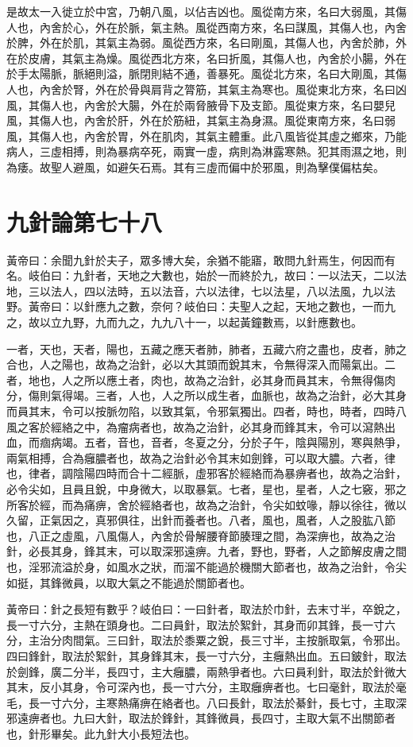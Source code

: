 是故太一入徙立於中宮，乃朝八風，以佔吉凶也。風從南方來，名曰大弱風，其傷人也，內舍於心，外在於脈，氣主熱。風從西南方來，名曰謀風，其傷人也，內舍於脾，外在於肌，其氣主為弱。風從西方來，名曰剛風，其傷人也，內舍於肺，外在於皮膚，其氣主為燥。風從西北方來，名曰折風，其傷人也，內舍於小腸，外在於手太陽脈，脈絕則溢，脈閉則結不通，善暴死。風從北方來，名曰大剛風，其傷人也，內舍於腎，外在於骨與肩背之膂筋，其氣主為寒也。風從東北方來，名曰凶風，其傷人也，內舍於大腸，外在於兩脅腋骨下及支節。風從東方來，名曰嬰兒風，其傷人也，內舍於肝，外在於筋紐，其氣主為身濕。風從東南方來，名曰弱風，其傷人也，內舍於胃，外在肌肉，其氣主體重。此八風皆從其虛之鄉來，乃能病人，三虛相搏，則為暴病卒死，兩實一虛，病則為淋露寒熱。犯其雨濕之地，則為痿。故聖人避風，如避矢石焉。其有三虛而偏中於邪風，則為擊僕偏枯矣。


\section{九針論第七十八}

黃帝曰：余聞九針於夫子，眾多博大矣，余猶不能寤，敢問九針焉生，何因而有名。岐伯曰：九針者，天地之大數也，始於一而終於九，故曰：一以法天，二以法地，三以法人，四以法時，五以法音，六以法律，七以法星，八以法風，九以法野。黃帝曰：以針應九之數，奈何？岐伯曰：夫聖人之起，天地之數也，一而九之，故以立九野，九而九之，九九八十一，以起黃鐘數焉，以針應數也。

一者，天也，天者，陽也，五藏之應天者肺，肺者，五藏六府之盡也，皮者，肺之合也，人之陽也，故為之治針，必以大其頭而銳其末，令無得深入而陽氣出。二者，地也，人之所以應土者，肉也，故為之治針，必其身而員其末，令無得傷肉分，傷則氣得竭。三者，人也，人之所以成生者，血脈也，故為之治針，必大其身而員其末，令可以按脈勿陷，以致其氣，令邪氣獨出。四者，時也，時者，四時八風之客於經絡之中，為瘤病者也，故為之治針，必其身而鋒其末，令可以瀉熱出血，而痼病竭。五者，音也，音者，冬夏之分，分於子午，陰與陽別，寒與熱爭，兩氣相搏，合為癰膿者也，故為之治針必令其末如劍鋒，可以取大膿。六者，律也，律者，調陰陽四時而合十二經脈，虛邪客於經絡而為暴痹者也，故為之治針，必令尖如，且員且銳，中身微大，以取暴氣。七者，星也，星者，人之七竅，邪之所客於經，而為痛痹，舍於經絡者也，故為之治針，令尖如蚊喙，靜以徐往，微以久留，正氣因之，真邪俱往，出針而養者也。八者，風也，風者，人之股肱八節也，八正之虛風，八風傷人，內舍於骨解腰脊節腠理之間，為深痹也，故為之治針，必長其身，鋒其末，可以取深邪遠痹。九者，野也，野者，人之節解皮膚之間也，淫邪流溢於身，如風水之狀，而溜不能過於機關大節者也，故為之治針，令尖如挺，其鋒微員，以取大氣之不能過於關節者也。

黃帝曰：針之長短有數乎？岐伯曰：一曰針者，取法於巾針，去末寸半，卒銳之，長一寸六分，主熱在頭身也。二曰員針，取法於絮針，其身而卯其鋒，長一寸六分，主治分肉間氣。三曰針，取法於黍粟之銳，長三寸半，主按脈取氣，令邪出。四曰鋒針，取法於絮針，其身鋒其末，長一寸六分，主癰熱出血。五曰鈹針，取法於劍鋒，廣二分半，長四寸，主大癰膿，兩熱爭者也。六曰員利針，取法於針微大其末，反小其身，令可深內也，長一寸六分，主取癰痹者也。七曰毫針，取法於毫毛，長一寸六分，主寒熱痛痹在絡者也。八曰長針，取法於綦針，長七寸，主取深邪遠痹者也。九曰大針，取法於鋒針，其鋒微員，長四寸，主取大氣不出關節者也，針形畢矣。此九針大小長短法也。


